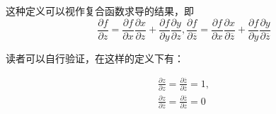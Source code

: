 \documentclass{ctexbook}
\begin{document}
这种定义可以视作复合函数求导的结果，即\[\frac{\partial f}{\partial z}=\frac{\partial f}{\partial x}\frac{\partial x}{\partial z}+\frac{\partial f}{\partial y}\frac{\partial y}{\partial z},\frac{\partial f}{\partial \overline{z}}=\frac{\partial f}{\partial x}\frac{\partial x}{\partial \overline{z}}+\frac{\partial f}{\partial y}\frac{\partial y}{\partial \overline{z}}\]

读者可以自行验证，在这样的定义下有：\begin{proposition}
    \begin{align*}
        \frac{\partial z}{\partial z}=\frac{\partial \overline{z}}{\partial \overline{z}}=1,\\
        \frac{\partial z}{\partial \overline{z}}=\frac{\partial \overline{z}}{\partial z}=0
    \end{align*}
\end{proposition}
\end{document}
